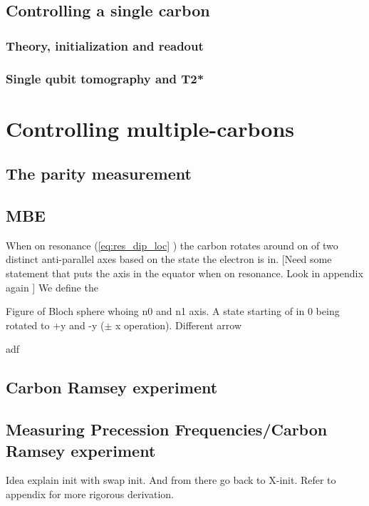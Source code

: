\subsection{Controlling a single carbon}



\subsubsection{Theory, initialization and readout}
\subsubsection{Single qubit tomography and T2*}

\section{Controlling multiple-carbons}
\subsection{The parity measurement}
\subsection{MBE}


When on resonance (\cref{eq:res_dip_loc} ) the carbon rotates around on of two distinct anti-parallel axes based on the state the electron is in.
[Need some statement that puts the axis in the equator when on resonance. Look in appendix again ]
We define the

Figure of Bloch sphere whoing n0 and n1 axis.
A state starting of in 0 being rotated to +y and -y ($\pm $ x operation).
Different arrow


adf

\subsection{Carbon Ramsey experiment }



\subsection{Measuring Precession Frequencies/Carbon Ramsey experiment}
Idea explain init with swap init. And from there go back to X-init. Refer to appendix for more rigorous derivation.





